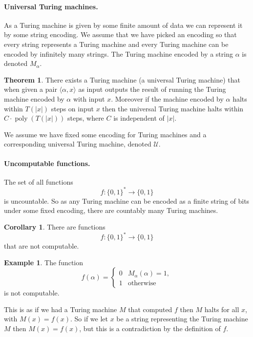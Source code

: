 \documentclass[11pt,a4paper]{article}
\theoremstyle{definition}
\newtheorem{thm}{Theorem}
\newtheorem{cor}{Corollary}
\newtheorem*{ex}{Example}
\newcommand{\U}{\mathcal{U}}
\DeclareMathOperator{\poly}{poly}
\begin{document}
\paragraph{Universal Turing machines.}
As a Turing machine is given by some finite amount of data we can represent it by some string encoding.
We assume that we have picked an encoding so that every string represents a Turing machine and every Turing machine can be encoded by infinitely many strings.
The Turing machine encoded by a string $\alpha$ is denoted $M_\alpha$.
\begin{thm}
There exists a Turing machine (a universal Turing machine) that when given a pair $\langle \alpha,x\rangle$ as input outputs the result of running the Turing machine encoded by $\alpha$ with input $x$.
Moreover if the machine encoded by $\alpha$ halts within $T(|x|)$ steps on input $x$ then the universal Turing machine halts within $C\cdot\poly(T(|x|))$ steps, where $C$ is independent of $|x|$.
\end{thm}

We assume we have fixed some encoding for Turing machines and a corresponding universal Turing machine, denoted $\U$.

\paragraph{Uncomputable functions.}
The set of all functions
\[
f\colon\{0,1\}^*\to\{0,1\}
\]
is uncountable.
So as any Turing machine can be encoded as a finite string of bits under some fixed encoding, there are countably many Turing machines.
\begin{cor}
There are functions
\[
f\colon\{0,1\}^*\to\{0,1\}
\]
that are not computable.
\end{cor}

\begin{ex}\label{firstuncomp}
The function
\[
f(\alpha) =\begin{cases} 0 & M_\alpha (\alpha) = 1,\\
1 &\text{otherwise}
\end{cases}
\]
is not computable.

This is as if we had a Turing machine $M$ that computed $f$ then $M$ halts for all $x$, with $M(x) = f(x)$.
So if we let $x$ be a string representing the Turing machine $M$ then $M(x) = f(x)$, but this is a contradiction by the definition of $f$.
\end{ex}
\end{document}

